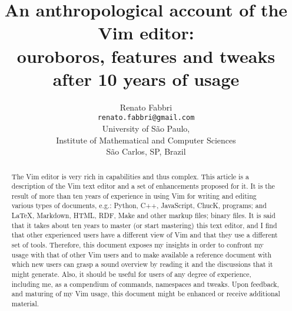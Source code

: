 \documentclass{article}
\begin{document}
\title{An anthropological account of the Vim editor:\\
ouroboros, features and tweaks after 10 years of usage}
\author{Renato Fabbri\\
\texttt{renato.fabbri@gmail.com}\\
University of São Paulo,\\
Institute of Mathematical and Computer Sciences\\
São Carlos, SP, Brazil
}
\maketitle
\begin{abstract}
The Vim editor is very rich in capabilities
and thus complex.
This article is a description of the Vim text editor
and a set of enhancements proposed for it.
It is the result of more than ten years of experience
in using Vim for writing and editing various types of documents,
e.g.:
Python, C++, JavaScript, ChucK, programs;
and \LaTeX, Markdown, HTML, RDF, Make and other markup files;
binary files.
It is said that it takes about ten years to master (or start mastering)
this text editor, and I find that other experienced users
have a different view of Vim and that they use a different
set of tools.
Therefore, this document exposes my insights in order
to confront my usage with that of other Vim users
and to make available a reference document with which new users
can grasp a sound overview by reading it and the discussions that
it might generate.
Also, it should be useful for users of any degree of experience,
including me, as a compendium of commands, namespaces and tweaks.
Upon feedback, and maturing of my Vim usage,
this document might be enhanced or receive additional
material.
\end{abstract}
\end{document}
